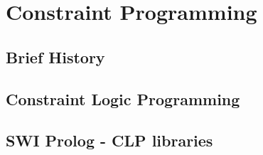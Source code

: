 \section{Constraint Programming}\label{sec:constraint_programming}

\subsection{Brief History}\label{subsec:brief_history}

\subsection{Constraint Logic Programming}\label{subsec:clp}

\subsection{SWI Prolog - CLP libraries}\label{subsec:clp_swi}
